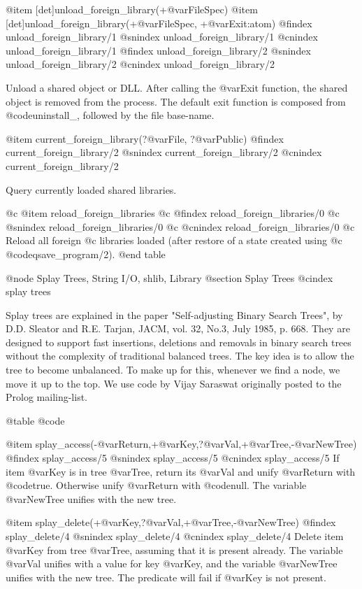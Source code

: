 {{{{{{{{{@item [det]unload_foreign_library(+@var{FileSpec})
@item [det]unload_foreign_library(+@var{FileSpec}, +@var{Exit}:atom) 
@findex unload_foreign_library/1
@snindex unload_foreign_library/1
@cnindex unload_foreign_library/1
@findex unload_foreign_library/2
@snindex unload_foreign_library/2
@cnindex unload_foreign_library/2

Unload a shared
object or DLL. After calling the @var{Exit} function, the shared object is
removed from the process. The default exit function is composed from
@code{uninstall_}, followed by the file base-name.

@item current_foreign_library(?@var{File}, ?@var{Public}) 
@findex current_foreign_library/2
@snindex current_foreign_library/2
@cnindex current_foreign_library/2

Query currently
loaded shared libraries.  

@c @item reload_foreign_libraries 
@c @findex reload_foreign_libraries/0
@c @snindex reload_foreign_libraries/0
@c @cnindex reload_foreign_libraries/0
@c Reload all foreign
@c libraries loaded (after restore of a state created using
@c @code{qsave_program/2}).
@end table

@node Splay Trees, String I/O, shlib, Library
@section Splay Trees
@cindex splay trees

Splay trees are explained in the paper "Self-adjusting Binary Search
Trees", by D.D. Sleator and R.E. Tarjan, JACM, vol. 32, No.3, July 1985,
p. 668. They are designed to support fast insertions, deletions and
removals in binary search trees without the complexity of traditional
balanced trees. The key idea is to allow the tree to become
unbalanced. To make up for this, whenever we find a node, we move it up
to the top. We use code by Vijay Saraswat originally posted to the Prolog
mailing-list.

@table @code

@item splay_access(-@var{Return},+@var{Key},?@var{Val},+@var{Tree},-@var{NewTree})
@findex splay_access/5
@snindex splay_access/5
@cnindex splay_access/5
If item @var{Key} is in tree @var{Tree}, return its @var{Val} and
unify @var{Return} with @code{true}. Otherwise unify @var{Return} with
@code{null}. The variable @var{NewTree} unifies with the new tree.

@item splay_delete(+@var{Key},?@var{Val},+@var{Tree},-@var{NewTree})
@findex splay_delete/4
@snindex splay_delete/4
@cnindex splay_delete/4
Delete item @var{Key} from tree @var{Tree}, assuming that it is present
already. The variable @var{Val} unifies with a value for key @var{Key},
and the variable @var{NewTree} unifies with the new tree. The predicate
will fail if @var{Key} is not present.

}}}}}}}}}
